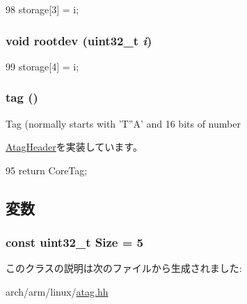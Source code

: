 \begin{DoxyCode}
98 { storage[3] = i; }
\end{DoxyCode}
\hypertarget{classAtagCore_af4d4fe4fbce50b7557161db8885f1fd1}{
\subsubsection[{rootdev}]{\setlength{\rightskip}{0pt plus 5cm}void rootdev ({\bf uint32\_\-t} {\em i})}}
\label{classAtagCore_af4d4fe4fbce50b7557161db8885f1fd1}



\begin{DoxyCode}
99 { storage[4] = i; }
\end{DoxyCode}
\hypertarget{classAtagCore_afe29fbb80b1d2765e37e98c6d259ea52}{
\subsubsection[{tag}]{ tag ()}}
\label{classAtagCore_afe29fbb80b1d2765e37e98c6d259ea52}
Tag (normally starts with 'T''A' and 16 bits of number 

\hyperlink{classAtagHeader_adad80b4c3e973afddab9e70f05faecd9}{AtagHeader}を実装しています。


\begin{DoxyCode}
95 { return CoreTag; }
\end{DoxyCode}


\subsection{変数}
\hypertarget{classAtagCore_a7ecea14dd0f3277e19580d4509fafdba}{
\subsubsection[{Size}]{\setlength{\rightskip}{0pt plus 5cm}const {\bf uint32\_\-t} {\bf Size} = 5}}
\label{classAtagCore_a7ecea14dd0f3277e19580d4509fafdba}


このクラスの説明は次のファイルから生成されました:\begin{DoxyCompactItemize}
\item 
arch/arm/linux/\hyperlink{atag_8hh}{atag.hh}\end{DoxyCompactItemize}

